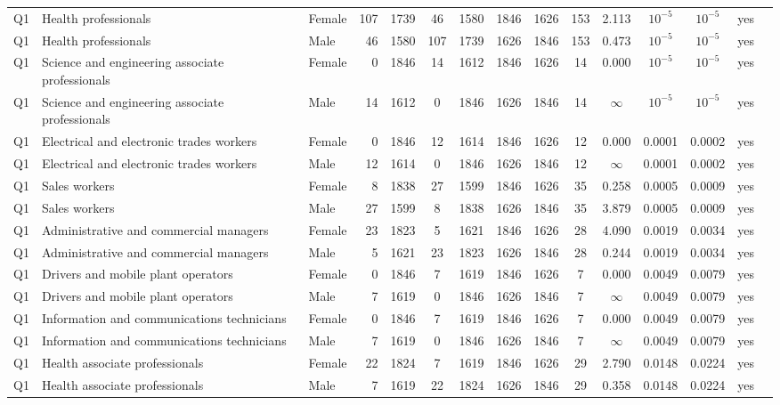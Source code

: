 \begin{longtable}{lllrcccccccccll}
Q1 & Health professionals & Female & 107 & 1739 & 46 & 1580 & 1846 & 1626 & 153 & 2.113 & $10^{-5}$ & $10^{-5}$ & yes \\
Q1 & Health professionals & Male & 46 & 1580 & 107 & 1739 & 1626 & 1846 & 153 & 0.473 & $10^{-5}$ & $10^{-5}$ & yes \\
Q1 & Science and engineering associate professionals & Female & 0 & 1846 & 14 & 1612 & 1846 & 1626 & 14 & 0.000 & $10^{-5}$ & $10^{-5}$ & yes \\
Q1 & Science and engineering associate professionals & Male & 14 & 1612 & 0 & 1846 & 1626 & 1846 & 14 & $\infty$ & $10^{-5}$ & $10^{-5}$ & yes \\
Q1 & Electrical and electronic trades workers & Female & 0 & 1846 & 12 & 1614 & 1846 & 1626 & 12 & 0.000 & 0.0001 & 0.0002 & yes \\
Q1 & Electrical and electronic trades workers & Male & 12 & 1614 & 0 & 1846 & 1626 & 1846 & 12 & $\infty$ & 0.0001 & 0.0002 & yes \\
Q1 & Sales workers & Female & 8 & 1838 & 27 & 1599 & 1846 & 1626 & 35 & 0.258 & 0.0005 & 0.0009 & yes \\
Q1 & Sales workers & Male & 27 & 1599 & 8 & 1838 & 1626 & 1846 & 35 & 3.879 & 0.0005 & 0.0009 & yes \\
Q1 & Administrative and commercial managers & Female & 23 & 1823 & 5 & 1621 & 1846 & 1626 & 28 & 4.090 & 0.0019 & 0.0034 & yes \\
Q1 & Administrative and commercial managers & Male & 5 & 1621 & 23 & 1823 & 1626 & 1846 & 28 & 0.244 & 0.0019 & 0.0034 & yes \\
Q1 & Drivers and mobile plant operators & Female & 0 & 1846 & 7 & 1619 & 1846 & 1626 & 7 & 0.000 & 0.0049 & 0.0079 & yes \\
Q1 & Drivers and mobile plant operators & Male & 7 & 1619 & 0 & 1846 & 1626 & 1846 & 7 & $\infty$ & 0.0049 & 0.0079 & yes \\
Q1 & Information and communications technicians & Female & 0 & 1846 & 7 & 1619 & 1846 & 1626 & 7 & 0.000 & 0.0049 & 0.0079 & yes \\
Q1 & Information and communications technicians & Male & 7 & 1619 & 0 & 1846 & 1626 & 1846 & 7 & $\infty$ & 0.0049 & 0.0079 & yes \\
Q1 & Health associate professionals & Female & 22 & 1824 & 7 & 1619 & 1846 & 1626 & 29 & 2.790 & 0.0148 & 0.0224 & yes \\
Q1 & Health associate professionals & Male & 7 & 1619 & 22 & 1824 & 1626 & 1846 & 29 & 0.358 & 0.0148 & 0.0224 & yes \\

\end{longtable}
